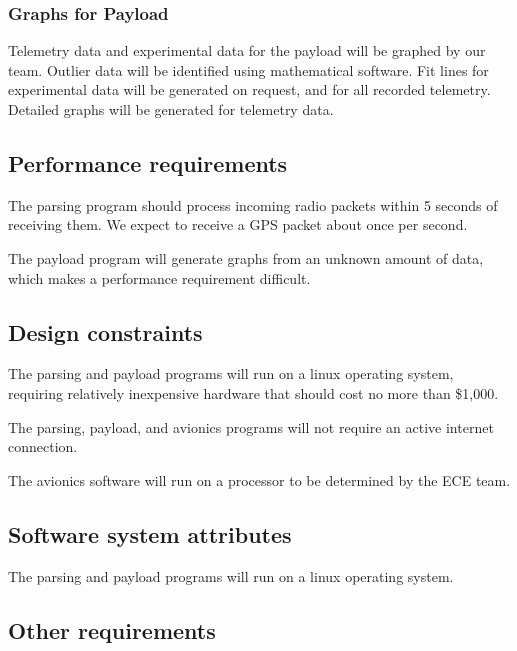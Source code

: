\documentclass[onecolumn, draftclsnofoot, 10pt, compsoc]{IEEEtran}
\begin{document}
\subsubsection{Graphs for Payload}
Telemetry data and experimental data for the payload will be graphed by our team. Outlier data will be identified using mathematical software. Fit lines for experimental data will be generated on request, and for all recorded telemetry. Detailed graphs will be generated for telemetry data.

\subsection{Performance requirements}
The parsing program should process incoming radio packets within 5 seconds of receiving them.  We expect to receive a GPS packet about once per second.

The payload program will generate graphs from an unknown amount of data, which makes a performance requirement difficult.

\subsection{Design constraints}
The parsing and payload programs will run on a linux operating system, requiring relatively inexpensive hardware that should cost no more than \$1,000.

The parsing, payload, and avionics programs will not require an active internet connection.

The avionics software will run on a processor to be determined by the ECE team.

\subsection{Software system attributes}
The parsing and payload programs will run on a linux operating system.

\subsection{Other requirements}
\end{document}
